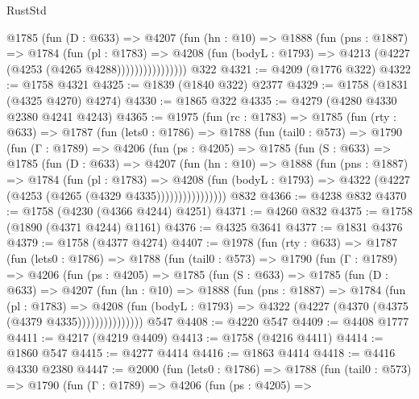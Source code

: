 \begin{lexlean}{RustStd}
\begin{coremodule}
{\begin{coremodule}
{{{{{{{{{{{{{{{                  @1785
                    (fun (D : @633) =>
                    @4207
                      (fun (hn : @10) =>
                      @1888
                        (fun (pns : @1887) =>
                        @1784
                          (fun (pl : @1783) =>
                          @4208
                            (fun (bodyL : @1793) => @4213 (@4227 (@4253 (@4265 @4288))))))))))))))))
    @322
@4321 := @4209 (@1776 @322)
@4322 := @1758 @4321
@4325 := @1839 (@1840 @322) @2377
@4329 := @1758 (@1831 (@4325 @4270) @4274)
@4330 := @1865 @322
@4335 := @4279 (@4280 @4330 @2380 @4241 @4243)
@4365 := @1975
    (fun (rc : @1783) =>
    @1785
      (fun (rty : @633) =>
      @1787
        (fun (lets0 : @1786) =>
        @1788
          (fun (tail0 : @573) =>
          @1790
            (fun (Γ : @1789) =>
            @4206
              (fun (ps : @4205) =>
              @1785
                (fun (S : @633) =>
                @1785
                  (fun (D : @633) =>
                  @4207
                    (fun (hn : @10) =>
                    @1888
                      (fun (pns : @1887) =>
                      @1784
                        (fun (pl : @1783) =>
                        @4208
                          (fun (bodyL : @1793) =>
                          @4322 (@4227 (@4253 (@4265 (@4329 @4335))))))))))))))))
    @832
@4366 := @4238 @832
@4370 := @1758 (@4230 (@4366 @4244) @4251)
@4371 := @4260 @832
@4375 := @1758 (@1890 (@4371 @4244) @1161)
@4376 := @4325 @3641
@4377 := @1831 @4376
@4379 := @1758 (@4377 @4274)
@4407 := @1978
    (fun (rty : @633) =>
    @1787
      (fun (lets0 : @1786) =>
      @1788
        (fun (tail0 : @573) =>
        @1790
          (fun (Γ : @1789) =>
          @4206
            (fun (ps : @4205) =>
            @1785
              (fun (S : @633) =>
              @1785
                (fun (D : @633) =>
                @4207
                  (fun (hn : @10) =>
                  @1888
                    (fun (pns : @1887) =>
                    @1784
                      (fun (pl : @1783) =>
                      @4208
                        (fun (bodyL : @1793) =>
                        @4322 (@4227 (@4370 (@4375 (@4379 @4335)))))))))))))))
    @547
@4408 := @4220 @547
@4409 := @4408 @1777
@4411 := @4217 (@4219 @4409)
@4413 := @1758 (@4216 @4411)
@4414 := @1860 @547
@4415 := @4277 @4414
@4416 := @1863 @4414
@4418 := @4416 @4330 @2380
@4447 := @2000
    (fun (lets0 : @1786) =>
    @1788
      (fun (tail0 : @573) =>
      @1790
        (fun (Γ : @1789) =>
        @4206
          (fun (ps : @4205) =>
}}}}}}}}}}}}}}}
\end{coremodule}}
\end{coremodule}
\end{lexlean}
